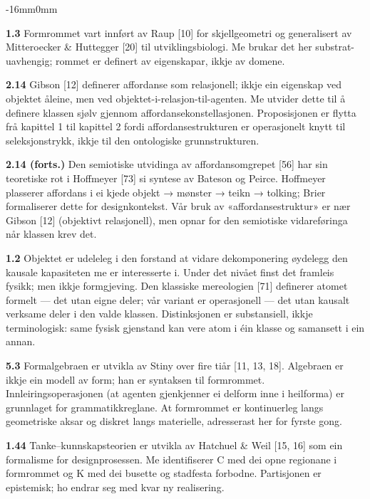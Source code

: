 \documentclass[10pt,oneside]{book}
\newenvironment{widebody}{%
  \begin{adjustwidth}{-16mm}{0mm}%
}{%
  \end{adjustwidth}%
}
\begin{document}
\par\addvspace{14pt}
\begin{widebody}
{\footnotesize

\textbf{1.3} Formrommet vart innført av Raup [10] for skjellgeometri og generalisert av Mitteroecker \& Huttegger [20] til utviklingsbiologi. Me brukar det her substrat-uavhengig; rommet er definert av eigenskapar, ikkje av domene.

\textbf{2.14} Gibson [12] definerer affordanse som relasjonell; ikkje ein eigenskap ved objektet åleine, men ved objektet-i-relasjon-til-agenten. Me utvider dette til å definere klassen sjølv gjennom affordansekonstellasjonen. Proposisjonen er flytta frå kapittel 1 til kapittel 2 fordi affordansestrukturen er operasjonelt knytt til seleksjonstrykk, ikkje til den ontologiske grunnstrukturen.

\textbf{2.14 (forts.)} Den semiotiske utvidinga av affordansomgrepet [56] har sin teoretiske rot i Hoffmeyer [73] si syntese av Bateson og Peirce. Hoffmeyer plasserer affordans i ei kjede objekt → mønster → teikn → tolking; Brier formaliserer dette for designkontekst. Vår bruk av «affordansestruktur» er nær Gibson [12] (objektivt relasjonell), men opnar for den semiotiske vidareføringa når klassen krev det.

\textbf{1.2} Objektet er udeleleg i den forstand at vidare dekomponering øydelegg den kausale kapasiteten me er interesserte i. Under det nivået finst det framleis fysikk; men ikkje formgjeving. Den klassiske mereologien [71] definerer atomet formelt — det utan eigne deler; vår variant er operasjonell — det utan kausalt verksame deler i den valde klassen. Distinksjonen er substansiell, ikkje terminologisk: same fysisk gjenstand kan vere atom i éin klasse og samansett i ein annan.

\textbf{5.3} Formalgebraen er utvikla av Stiny over fire tiår [11, 13, 18]. Algebraen er ikkje ein modell av form; han er syntaksen til formrommet. Innleiringsoperasjonen (at agenten gjenkjenner ei delform inne i heilforma) er grunnlaget for grammatikkreglane. At formrommet er kontinuerleg langs geometriske aksar og diskret langs materielle, adresserast her for fyrste gong.

\textbf{1.44} Tanke--kunnskapsteorien er utvikla av Hatchuel \& Weil [15, 16] som ein formalisme for designprosessen. Me identifiserer C med dei opne regionane i formrommet og K med dei busette og stadfesta forbodne. Partisjonen er epistemisk; ho endrar seg med kvar ny realisering.

}
\end{widebody}
\end{document}
